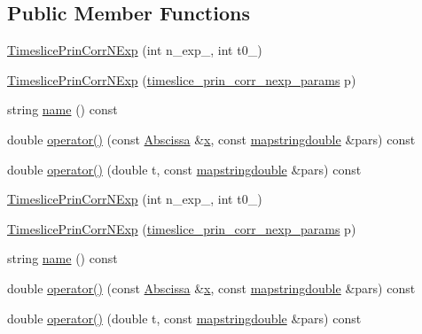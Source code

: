 \subsection*{Public Member Functions}
\begin{DoxyCompactItemize}
\item 
\mbox{\hyperlink{classTimeslicePrinCorrNExp_a30e3c7e1e12c8122c8787babd1f7920c}{Timeslice\+Prin\+Corr\+N\+Exp}} (int n\+\_\+exp\+\_\+, int t0\+\_\+)
\item 
\mbox{\hyperlink{classTimeslicePrinCorrNExp_a12665de55c898b2474db770de30c330c}{Timeslice\+Prin\+Corr\+N\+Exp}} (\mbox{\hyperlink{structtimeslice__prin__corr__nexp__params}{timeslice\+\_\+prin\+\_\+corr\+\_\+nexp\+\_\+params}} p)
\item 
string \mbox{\hyperlink{classTimeslicePrinCorrNExp_a02d5af4384f14f17322e865c882c5b15}{name}} () const
\item 
double \mbox{\hyperlink{classTimeslicePrinCorrNExp_a9a55af8256beba8993e5163bdab55571}{operator()}} (const \mbox{\hyperlink{classAbscissa}{Abscissa}} \&\mbox{\hyperlink{old__edb_8cc_a63584b830e7aaacb521b11b72291a4bc}{x}}, const \mbox{\hyperlink{lib_2fitting__lib_2includes_8h_a647b481c557c7966517f753340a81d13}{mapstringdouble}} \&pars) const
\item 
double \mbox{\hyperlink{classTimeslicePrinCorrNExp_a3e258d5590d272f3f3dc735dd84c6702}{operator()}} (double t, const \mbox{\hyperlink{lib_2fitting__lib_2includes_8h_a647b481c557c7966517f753340a81d13}{mapstringdouble}} \&pars) const
\item 
\mbox{\hyperlink{classTimeslicePrinCorrNExp_a30e3c7e1e12c8122c8787babd1f7920c}{Timeslice\+Prin\+Corr\+N\+Exp}} (int n\+\_\+exp\+\_\+, int t0\+\_\+)
\item 
\mbox{\hyperlink{classTimeslicePrinCorrNExp_a12665de55c898b2474db770de30c330c}{Timeslice\+Prin\+Corr\+N\+Exp}} (\mbox{\hyperlink{structtimeslice__prin__corr__nexp__params}{timeslice\+\_\+prin\+\_\+corr\+\_\+nexp\+\_\+params}} p)
\item 
string \mbox{\hyperlink{classTimeslicePrinCorrNExp_a02d5af4384f14f17322e865c882c5b15}{name}} () const
\item 
double \mbox{\hyperlink{classTimeslicePrinCorrNExp_a9a55af8256beba8993e5163bdab55571}{operator()}} (const \mbox{\hyperlink{classAbscissa}{Abscissa}} \&\mbox{\hyperlink{old__edb_8cc_a63584b830e7aaacb521b11b72291a4bc}{x}}, const \mbox{\hyperlink{lib_2fitting__lib_2includes_8h_a647b481c557c7966517f753340a81d13}{mapstringdouble}} \&pars) const
\item 
double \mbox{\hyperlink{classTimeslicePrinCorrNExp_a3e258d5590d272f3f3dc735dd84c6702}{operator()}} (double t, const \mbox{\hyperlink{lib_2fitting__lib_2includes_8h_a647b481c557c7966517f753340a81d13}{mapstringdouble}} \&pars) const
\end{DoxyCompactItemize}
